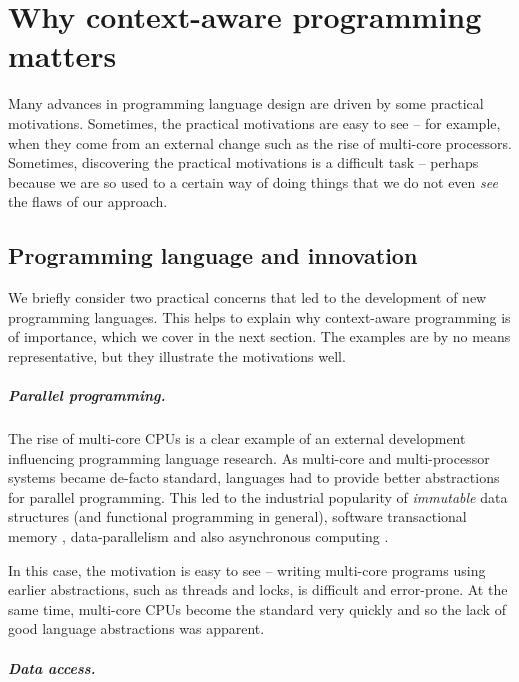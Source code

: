 \chapter{Why context-aware programming matters} 
\label{ch:introduction1} 

Many advances in programming language design are driven by some practical motivations. Sometimes, 
the practical motivations are easy to see -- for example, when they come from an external change 
such as the rise of multi-core processors. Sometimes, discovering the practical motivations is a 
difficult task -- perhaps because we are so used to a certain way of doing things that we do not 
even \emph{see} the flaws of our approach. 


\section{Programming language and innovation}

We briefly consider two practical concerns that led to the development of new programming languages. 
This helps to explain why context-aware programming is of importance, which we cover in the next section. 
The examples are by no means representative, but they illustrate the motivations well.

\paragraph{Parallel programming.} 

The rise of multi-core CPUs is a clear example of an external development influencing
programming language research. As multi-core and multi-processor systems became de-facto standard, 
languages had to provide better abstractions for parallel programming. This led to the industrial 
popularity of \emph{immutable} data structures (and functional programming in general), software 
transactional memory \cite{app-haskell-stm}, data-parallelism and also asynchronous 
computing \cite{app-fsharp-async}. 

In this case, the motivation is easy to see -- writing multi-core programs using earlier 
abstractions, such as threads and locks, is difficult and error-prone. At the same time, 
multi-core CPUs become the standard very quickly and so the lack of good language abstractions
was apparent.

\paragraph{Data access.}

